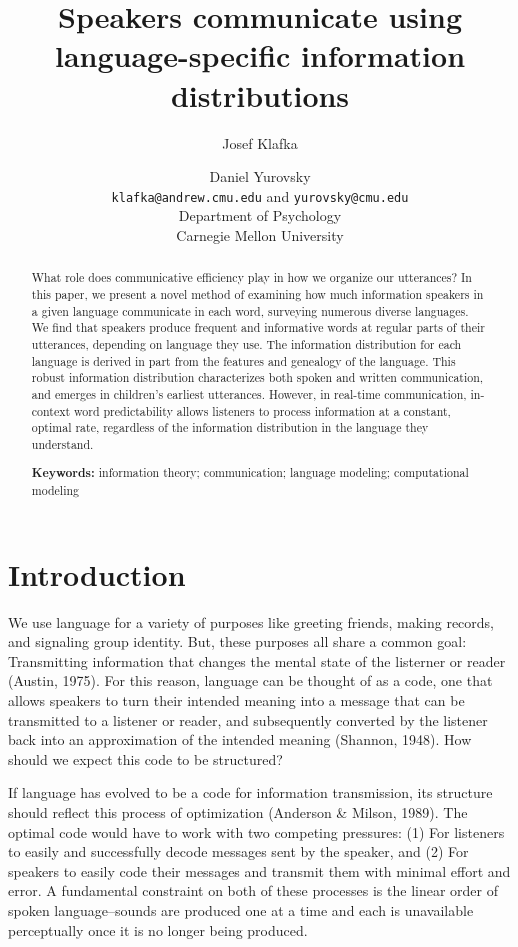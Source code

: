\documentclass[10pt, letterpaper]{article}
\title{Speakers communicate using language-specific information distributions}
\author{Josef Klafka \and Daniel Yurovsky \\
        \texttt{klafka@andrew.cmu.edu} and \texttt{yurovsky@cmu.edu} \\
       Department of Psychology \\ Carnegie Mellon University}
\begin{document}
\maketitle

\begin{abstract}
What role does communicative efficiency play in how we organize our
utterances? In this paper, we present a novel method of examining how
much information speakers in a given language communicate in each word,
surveying numerous diverse languages. We find that speakers produce
frequent and informative words at regular parts of their utterances,
depending on language they use. The information distribution for each
language is derived in part from the features and genealogy of the
language. This robust information distribution characterizes both spoken
and written communication, and emerges in children's earliest
utterances. However, in real-time communication, in-context word
predictability allows listeners to process information at a constant,
optimal rate, regardless of the information distribution in the language
they understand.

\textbf{Keywords:}
information theory; communication; language modeling; computational
modeling
\end{abstract}

\hypertarget{introduction}{%
\section{Introduction}\label{introduction}}

We use language for a variety of purposes like greeting friends, making
records, and signaling group identity. But, these purposes all share a
common goal: Transmitting information that changes the mental state of
the listerner or reader (Austin, 1975). For this reason, language can be
thought of as a code, one that allows speakers to turn their intended
meaning into a message that can be transmitted to a listener or reader,
and subsequently converted by the listener back into an approximation of
the intended meaning (Shannon, 1948). How should we expect this code to
be structured?

If language has evolved to be a code for information transmission, its
structure should reflect this process of optimization (Anderson \&
Milson, 1989). The optimal code would have to work with two competing
pressures: (1) For listeners to easily and successfully decode messages
sent by the speaker, and (2) For speakers to easily code their messages
and transmit them with minimal effort and error. A fundamental
constraint on both of these processes is the linear order of spoken
language--sounds are produced one at a time and each is unavailable
perceptually once it is no longer being produced.
\end{document}
